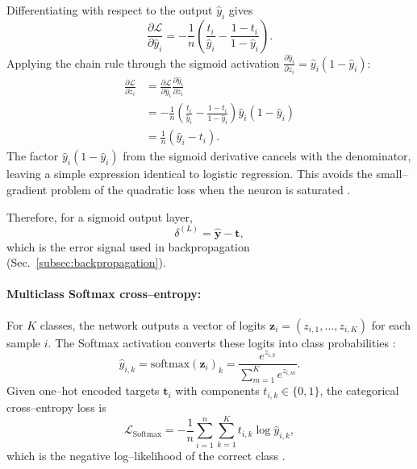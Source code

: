 \documentclass[amssymb,twocolumn,aps]{revtex4}
\begin{document}
Differentiating with respect to the output $\hat{y}_i$ gives
\begin{equation}
\frac{\partial \mathcal{L}}{\partial \hat{y}_i}
= -\frac{1}{n}\left(\frac{t_i}{\hat{y}_i}-\frac{1-t_i}{1-\hat{y}_i}\right).
\end{equation}
Applying the chain rule through the sigmoid activation
$\frac{\partial \hat{y}_i}{\partial z_i}=\hat{y}_i(1-\hat{y}_i)$:
\begin{align}
\frac{\partial \mathcal{L}}{\partial z_i}
&=\frac{\partial \mathcal{L}}{\partial \hat{y}_i}
  \frac{\partial \hat{y}_i}{\partial z_i} \nonumber\\[4pt]
&=-\frac{1}{n}\!\left(\frac{t_i}{\hat{y}_i}-\frac{1-t_i}{1-\hat{y}_i}\right)
  \hat{y}_i(1-\hat{y}_i) \nonumber\\[4pt]
&=\frac{1}{n}(\hat{y}_i-t_i).
\end{align}
The factor $\hat{y}_i(1-\hat{y}_i)$ from the sigmoid derivative cancels with the
denominator, leaving a simple expression identical to logistic regression.
This avoids the small--gradient problem of the quadratic loss when the neuron
is saturated \cite{nielsen2015}.

Therefore, for a sigmoid output layer,
\begin{equation}
\delta^{(L)} = \hat{\mathbf{y}} - \mathbf{t},
\end{equation}
which is the error signal used in backpropagation
(Sec.~\ref{subsec:backpropagation}).



\paragraph{Multiclass Softmax cross--entropy:}
For $K$ classes, the network outputs a vector of logits
$\mathbf{z}_i = (z_{i,1},\dots,z_{i,K})$ for each sample $i$.
The Softmax activation converts these logits into class probabilities
\cite{goodfellow2016,deisenroth2020}:
\begin{equation}
\hat{y}_{i,k} = \mathrm{softmax}(\mathbf{z}_i)_k
= \frac{e^{z_{i,k}}}{\sum_{m=1}^{K} e^{z_{i,m}}}.
\end{equation}
Given one--hot encoded targets $\mathbf{t}_i$ with components $t_{i,k}\in\{0,1\}$,
the categorical cross--entropy loss is
\begin{equation}
\label{eq:softmax_loss}
\mathcal{L}_{\mathrm{Softmax}}
= -\frac{1}{n}\sum_{i=1}^{n}\sum_{k=1}^{K}
t_{i,k}\log \hat{y}_{i,k},
\end{equation}
which is the negative log--likelihood of the correct class
\cite{goodfellow2016}.
\end{document}
